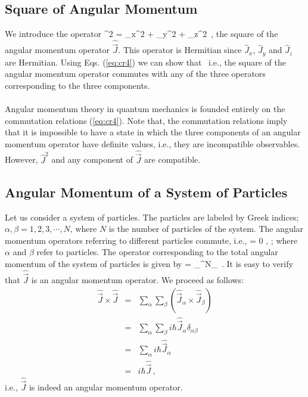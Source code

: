 \subsection{Square of Angular Momentum}
We introduce the operator
\be
{}^2 = _x^2 + _y^2 + _z^2\, ,
\ee
the square of the angular momentum operator $\hat{\vec{J}}$. This operator is Hermitian
since $\hat{J}_x$, $\hat{J}_y$ and $\hat{J}_z$ are Hermitian. Using Eqs. (\ref{eq:cr4}) we can show that
\, 
\ee
i.e., the square of the angular momentum operator commutes with any of the three operators corresponding to the three
components.

\paragraph{}
Angular momentum theory in quantum mechanics is founded entirely on the commutation relations (\ref{eq:cr4}). Note that, the commutation 
relations imply that it is impossible to have a state in which the three components of an angular momentum operator have 
definite values, i.e., they are incompatible observables. However, $\hat{J}^2$ and any component of $\hat{\vec{J}}$
are compatible.

\subsection{Angular Momentum of a System of Particles}
Let us consider a system of particles. The particles are labeled by Greek indices; $\alpha, \beta = 1,2, 3, \cdots, N$, where
$N$ is the number of particles of the system. The angular momentum operators referring to different particles
commute, i.e., 
 = 0 , \;\;\; \alpha \neq \beta;
\ee
where $\alpha$ and $\beta$ refer to particles. The operator corresponding to the total angular momentum of the system of
particles is given by 
\be
{} = \sum_{}^{N}_{\alpha}\, .
\ee
It is easy to verify that $\hat{\vec{J}}$ is an angular momentum operator. We proceed as follows:
\begin{eqnarray} 
\hat{\vec{J}} \times \hat{\vec{J}} & = & \sum_{\alpha}\sum_{\beta}\left( \hat{\vec{J}}_{\alpha}\times \hat{\vec{J}}_{\beta} \right)\nonumber \\
& = & \sum_{\alpha}\sum_{\beta} i\hbar \hat{\vec{J}}_{\alpha}\delta_{\alpha \beta} \nonumber \\
& = & \sum_{\alpha} i \hbar \hat{\vec{J}}_{\alpha} \nonumber \\
&= & i \hbar \hat{\vec{J}}\, , 
\end{eqnarray}
i.e., $\hat{\vec{J}}$ is indeed an angular momentum operator.																	



